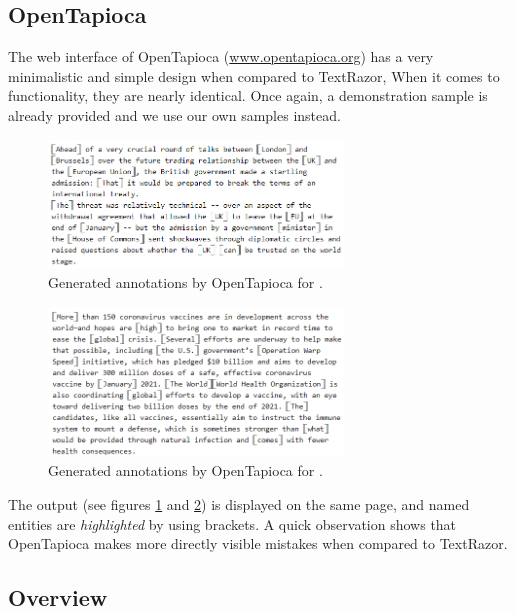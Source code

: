 \documentclass[a4paper, 11pt]{article}
\begin{document}
\subsection{OpenTapioca}

The web interface of OpenTapioca (\url{www.opentapioca.org}) has a very minimalistic and simple design when compared to TextRazor, When it comes to functionality, they are nearly identical. Once again, a demonstration sample is already provided and we use our own samples instead.

\begin{figure}[H]
	\label{fig:doc1ot}
	\centering
	\includegraphics[width=0.7\textwidth]{doc1_ot.png}
	\caption{Generated annotations by OpenTapioca for \citet{mcgee_2020}.}
\end{figure}

\begin{figure}[H]
	\label{fig:doc2ot}
	\centering
	\includegraphics[width=0.7\textwidth]{doc2_ot.png}
	\caption{Generated annotations by OpenTapioca for \citet{mckeever_2020}.}
\end{figure}

The output (see figures \ref{fig:doc1ot} and \ref{fig:doc2ot}) is displayed on the same page, and named entities are \textit{highlighted} by using brackets. A quick observation shows that OpenTapioca makes more directly visible mistakes when compared to TextRazor. 

\subsection{Overview}
\end{document}
